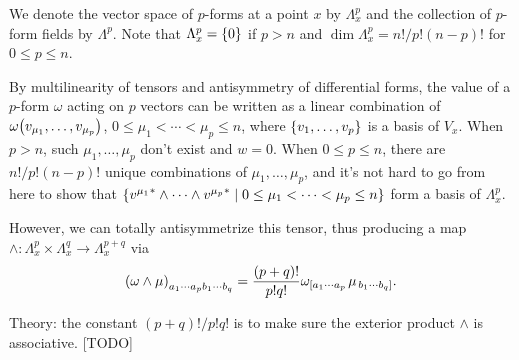 \documentclass{note}
\numberwithin{equation}{chapter}
\begin{document}

\begin{quotebar}
    We denote the vector space of $p$-forms at a point $x$ by $\Lambda_x^p$ and the
    collection of $p$-form fields by $\Lambda^p$. Note that $\Lambda_x^p = \set{0}$
    if $p > n$ and $\dim \Lambda_x^p = n!/p!(n-p)!$ for $0 \leq p \leq n$.
\end{quotebar}

By multilinearity of tensors and antisymmetry of differential forms, the value
of a $p$-form $\omega$ acting on $p$ vectors can be written as a linear
combination of $\omega\prn{v_{\mu_1},\dots,v_{\mu_p}}$, $0 \leq \mu_1 < \cdots
    < \mu_p \leq n$, where $\set{v_1,\dots,v_p}$ is a basis of $V_x$. When $p > n$,
such $\mu_1, \dots, \mu_p$ don't exist and $w = 0$. When $0 \leq p \leq n$,
there are $n!/p!(n-p)!$ unique combinations of $\mu_1, \dots, \mu_p$, and it's
not hard to go from here to show that $\setbuilder{{v^{\mu_1}}^* \wedge \cdots
        \wedge {v^{\mu_p}}^*}{0 \leq \mu_1 < \cdots < \mu_p \leq n}$ form a basis of
$\Lambda_x^p$.

\begin{quotebar}
    However, we can totally antisymmetrize this tensor, thus producing a map
    $\wedge\colon \Lambda_x^p\times\Lambda_x^q \to \Lambda_x^{p+q}$ via
    \begin{equation*}
        \prn{\omega\wedge\mu}_{a_1\cdots a_pb_1\cdots b_q} = \frac{(p+q)!}{p!q!}
        \omega_{\left[a_1\cdots a_p\right.}\mu_{\left.b_1\cdots b_q\right]}.
    \end{equation*}
\end{quotebar}

Theory: the constant $(p+q)!/p!q!$ is to make sure the exterior product
$\wedge$ is associative. [TODO]




\end{document}
